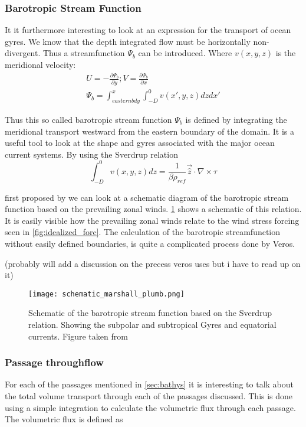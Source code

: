 \begin{multicols}{2}
\subsubsection{Barotropic Stream Function} \label{sec:BSF_theory}
It it furthermore interesting to look at an expression for the transport of ocean gyres. We know that the depth integrated flow must be horizontally non-divergent. Thus a streamfunction $\Psi_{b}$ can be introduced. Where $v(x,y,z)$ is the meridional velocity:
\begin{align}
U = -\frac{\partial \Psi_{b}}{\partial y}; V=\frac{\partial \Psi_{b}}{\partial x} \\
\Psi_{b} = \int_{eastern bdy}^{x} \int_{-D}^{0} v(x',y,z) dz dx'
\end{align}

Thus this so called barotropic stream function $\Psi_{b}$ is defined by integrating the meridional transport westward from the eastern boundary of the domain. It is a useful tool to look at the shape and gyres associated with the major ocean current systems. By using the Sverdrup relation
$$
\int_{-D}^{0}v(x,y,z) dz = \frac{1}{\beta \rho_{ref}}\vec{\hat{z}}\cdot \nabla \times \tau
$$

 first proposed by \cite{sverdrup1947wind} we can look at a schematic diagram of the barotropic stream function based on the prevailing zonal winds. \cref{fig:schem_currents} shows a schematic of this relation. It is easily visible how the prevailing zonal winds relate to the wind stress forcing seen in \cref{fig:idealized_forc}. The calculation of the barotropic streamfunction without easily defined boundaries, is quite a complicated process done by Veros. 
 
 
 (probably will add a discussion on the precess veros uses but i have to read up on it)
 
  \begin{figure}[H]
 	\texttt{[image: schematic\_marshall\_plumb.png]}
 	\caption{Schematic of the barotropic stream function based on the Sverdrup relation. Showing the subpolar and subtropical Gyres and equatorial currents. Figure taken from \cite{MarschallPlumb}}
 	\label{fig:schem_currents}
 \end{figure}
\subsubsection{Passage throughflow}\label{sec:throughflowp}
For each of the passages mentioned in \cref{sec:bathys} it is interesting to talk about the total volume transport through each of the passages discussed. This is done using a simple integration to calculate the volumetric flux through each passage. The volumetric flux is defined as


\end{multicols}
